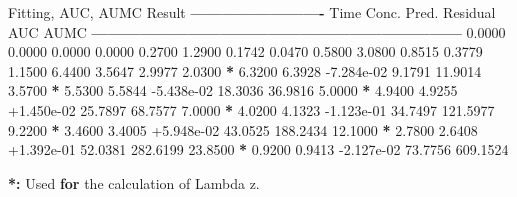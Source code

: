 \documentclass[12pt,]{krantz}
\newenvironment{Shaded}{\begin{snugshade}}{\end{snugshade}}
\newcommand{\ControlFlowTok}[1]{\textcolor[rgb]{0.13,0.29,0.53}{\textbf{#1}}}
\newcommand{\ErrorTok}[1]{\textcolor[rgb]{0.64,0.00,0.00}{\textbf{#1}}}
\newcommand{\FloatTok}[1]{\textcolor[rgb]{0.00,0.00,0.81}{#1}}
\newcommand{\NormalTok}[1]{#1}
\newcommand{\OperatorTok}[1]{\textcolor[rgb]{0.81,0.36,0.00}{\textbf{#1}}}
\newcommand{\StringTok}[1]{\textcolor[rgb]{0.31,0.60,0.02}{#1}}
\begin{document}
\begin{Shaded}
\begin{Highlighting}[]
\NormalTok{Fitting, AUC, AUMC Result}
\OperatorTok{-------------------------}
\StringTok{      }\NormalTok{Time         Conc.      Pred.   Residual       AUC       AUMC}
\OperatorTok{---------------------------------------------------------------------}
\StringTok{     }\FloatTok{0.0000}       \FloatTok{0.0000}                           \FloatTok{0.0000}     \FloatTok{0.0000}
     \FloatTok{0.2700}       \FloatTok{1.2900}                           \FloatTok{0.1742}     \FloatTok{0.0470}
     \FloatTok{0.5800}       \FloatTok{3.0800}                           \FloatTok{0.8515}     \FloatTok{0.3779}
     \FloatTok{1.1500}       \FloatTok{6.4400}                           \FloatTok{3.5647}     \FloatTok{2.9977}
     \FloatTok{2.0300} \OperatorTok{*}\StringTok{     }\FloatTok{6.3200}     \FloatTok{6.3928} \FloatTok{-7.284e-02}     \FloatTok{9.1791}    \FloatTok{11.9014}
     \FloatTok{3.5700} \OperatorTok{*}\StringTok{     }\FloatTok{5.5300}     \FloatTok{5.5844} \FloatTok{-5.438e-02}    \FloatTok{18.3036}    \FloatTok{36.9816}
     \FloatTok{5.0000} \OperatorTok{*}\StringTok{     }\FloatTok{4.9400}     \FloatTok{4.9255} \FloatTok{+1.450e-02}    \FloatTok{25.7897}    \FloatTok{68.7577}
     \FloatTok{7.0000} \OperatorTok{*}\StringTok{     }\FloatTok{4.0200}     \FloatTok{4.1323} \FloatTok{-1.123e-01}    \FloatTok{34.7497}   \FloatTok{121.5977}
     \FloatTok{9.2200} \OperatorTok{*}\StringTok{     }\FloatTok{3.4600}     \FloatTok{3.4005} \FloatTok{+5.948e-02}    \FloatTok{43.0525}   \FloatTok{188.2434}
    \FloatTok{12.1000} \OperatorTok{*}\StringTok{     }\FloatTok{2.7800}     \FloatTok{2.6408} \FloatTok{+1.392e-01}    \FloatTok{52.0381}   \FloatTok{282.6199}
    \FloatTok{23.8500} \OperatorTok{*}\StringTok{     }\FloatTok{0.9200}     \FloatTok{0.9413} \FloatTok{-2.127e-02}    \FloatTok{73.7756}   \FloatTok{609.1524}

\OperatorTok{*}\ErrorTok{:}\StringTok{ }\NormalTok{Used }\ControlFlowTok{for}\NormalTok{ the calculation of Lambda z.}



\end{Highlighting}
\end{Shaded}
\end{document}
